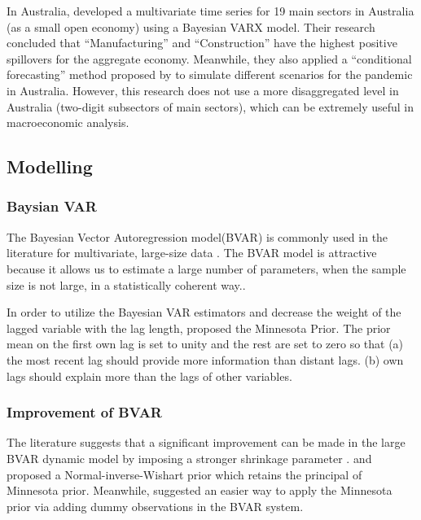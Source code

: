 \documentclass[11pt,a4paper,]{article}
\begin{document}
In Australia, \textcite{anderson2020} developed a multivariate time series for 19 main sectors in Australia (as a small open economy) using a Bayesian VARX model. Their research concluded that ``Manufacturing'' and ``Construction'' have the highest positive spillovers for the aggregate economy. Meanwhile, they also applied a ``conditional forecasting'' method proposed by \textcite{waggoner1999} to simulate different scenarios for the pandemic in Australia. However, this research does not use a more disaggregated level in Australia (two-digit subsectors of main sectors), which can be extremely useful in macroeconomic analysis.

\hypertarget{modelling}{%
\subsection{Modelling}\label{modelling}}

\hypertarget{baysian-var}{%
\subsubsection{Baysian VAR}\label{baysian-var}}

The Bayesian Vector Autoregression model(BVAR) is commonly used in the literature for multivariate, large-size data \autocites[e.g.][]{anderson2020,litterman1986,banbura2010large}. The BVAR model is attractive because it allows us to estimate a large number of parameters, when the sample size is not large, in a statistically coherent way.\autocite{litterman1986,wozniak2016bayesian}.

In order to utilize the Bayesian VAR estimators and decrease the weight of the lagged variable with the lag length, \textcite{litterman1979} proposed the Minnesota Prior. The prior mean on the first own lag is set to unity and the rest are set to zero so that (a) the most recent lag should provide more information than distant lags. (b) own lags should explain more than the lags of other variables.

\hypertarget{improvement-of-bvar}{%
\subsubsection{Improvement of BVAR}\label{improvement-of-bvar}}

The literature suggests that a significant improvement can be made in the large BVAR dynamic model by imposing a stronger shrinkage parameter \autocite{banbura2010large,litterman1986}. \textcite{robertson1999vector} and \textcite{kadiyala1997} proposed a Normal-inverse-Wishart prior which retains the principal of Minnesota prior. Meanwhile, \textcite{banbura2010large} suggested an easier way to apply the Minnesota prior via adding dummy observations in the BVAR system.
\end{document}
